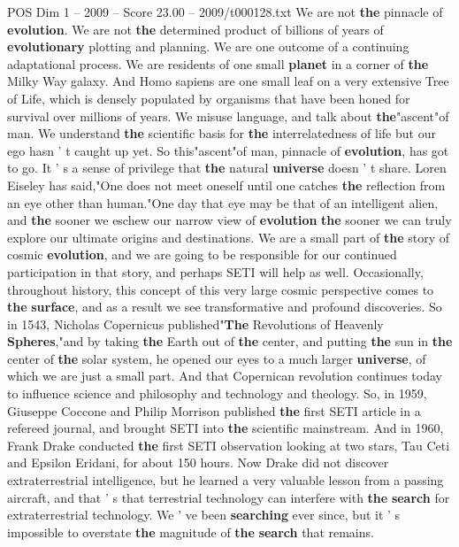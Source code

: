 \begin{textsample}{POS Dim 1 – 2009 – Score 23.00 – 2009/t000128.txt}
We are not \textbf{the} pinnacle of \textbf{evolution}.
We are not \textbf{the} determined product of billions of years of \textbf{evolutionary} plotting and planning.
We are one outcome of a continuing adaptational process.
We are residents of one small \textbf{planet} in a corner of \textbf{the} Milky Way galaxy.
And Homo sapiens are one small leaf on a very extensive Tree of Life, which is densely populated by organisms that have been honed for survival over millions of years.
We misuse language, and talk about \textbf{the}"ascent"of man.
We understand \textbf{the} scientific basis for \textbf{the} interrelatedness of life but our ego hasn ' t caught up yet.
So this"ascent"of man, pinnacle of \textbf{evolution}, has got to go.
It ' s a sense of privilege that \textbf{the} natural \textbf{universe} doesn ' t share.
Loren Eiseley has said,"One does not meet oneself until one catches \textbf{the} reflection from an eye other than human."One day that eye may be that of an intelligent alien, and \textbf{the} sooner we eschew our narrow view of \textbf{evolution} \textbf{the} sooner we can truly explore our ultimate origins and destinations.
We are a small part of \textbf{the} story of cosmic \textbf{evolution}, and we are going to be responsible for our continued participation in that story, and perhaps SETI will help as well.
Occasionally, throughout history, this concept of this very large cosmic perspective comes to \textbf{the} \textbf{surface}, and as a result we see transformative and profound discoveries.
So in 1543, Nicholas Copernicus published"\textbf{The} Revolutions of Heavenly \textbf{Spheres},"and by taking \textbf{the} Earth out of \textbf{the} center, and putting \textbf{the} sun in \textbf{the} center of \textbf{the} solar system, he opened our eyes to a much larger \textbf{universe}, of which we are just a small part.
And that Copernican revolution continues today to influence science and philosophy and technology and theology.
So, in 1959, Giuseppe Coccone and Philip Morrison published \textbf{the} first SETI article in a refereed journal, and brought SETI into \textbf{the} scientific mainstream.
And in 1960, Frank Drake conducted \textbf{the} first SETI observation looking at two stars, Tau Ceti and Epsilon Eridani, for about 150 hours.
Now Drake did not discover extraterrestrial intelligence, but he learned a very valuable lesson from a passing aircraft, and that ' s that terrestrial technology can interfere with \textbf{the} \textbf{search} for extraterrestrial technology.
We ' ve been \textbf{searching} ever since, but it ' s impossible to overstate \textbf{the} magnitude of \textbf{the} \textbf{search} that remains.

\end{textsample}
